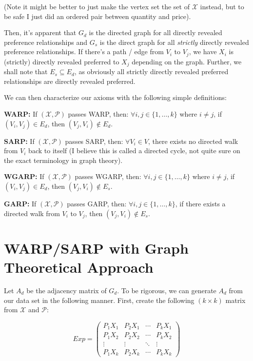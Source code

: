 \documentclass{article} %
\begin{document}
(Note it might be better to just make the vertex set the set of $\mathcal{X}$ instead, but to be safe I just did an ordered pair between quantity and price).


Then, it's apparent that $G_d$ is the directed graph for all directly revealed preference relationships and $G_s$ is the direct graph for all \textit{strictly} directly revealed preference relationships. If there's a path / edge from $V_i$ to $V_j$, we have $X_i$ is (strictly) directly revealed preferred to $X_j$ depending on the graph. Further, we shall note that $E_s\subseteq E_d$, as obviously all strictly directly revealed preferred relationships are directly revealed preferred.


We can then characterize our axioms with the following simple definitions:


\textbf{WARP:} If $(\mathcal{X},\mathcal{P})$ passes WARP, then: $\forall i,j\in\{1,\dots,k\}$ where $i\not=j$, if $(V_i,V_j)\in E_d$, then $(V_j, V_i)\not\in E_d$.


\textbf{SARP:} If $(\mathcal{X},\mathcal{P})$ passes SARP, then: $\forall V_i \in V$, there exists no directed walk from $V_i$ back to itself (I believe this is called a directed cycle, not quite sure on the exact terminology in graph theory).


\textbf{WGARP:} If $(\mathcal{X},\mathcal{P})$ passes WGARP, then: $\forall i,j\in\{1,\dots,k\}$ where $i\not=j$, if $(V_i,V_j)\in E_d$, then $(V_j, V_i)\not\in E_s$.


\textbf{GARP:} If $(\mathcal{X},\mathcal{P})$ passes GARP, then: $\forall i,j\in\{1,\dots,k\}$, if there exists a directed walk from $V_i$ to $V_j$, then $(V_j,V_i)\not\in E_s$.


\section{WARP/SARP with Graph Theoretical Approach}

Let $A_d$ be the adjacency matrix of $G_d$. To be rigorous, we can generate $A_d$ from our data set in the following manner. First, create the following $(k\times k)$ matrix from $\mathcal{X}$ and $\mathcal{P}$:

\[
Exp = 
 \begin{pmatrix}
  P_1X_1 & P_2X_1 & \cdots & P_kX_1 \\
  P_1X_2 & P_2X_2 & \cdots & P_kX_2 \\
  \vdots  & \vdots  & \ddots & \vdots  \\
  P_1X_k & P_2X_k & \cdots & P_kX_k
 \end{pmatrix}
\]
\end{document}
